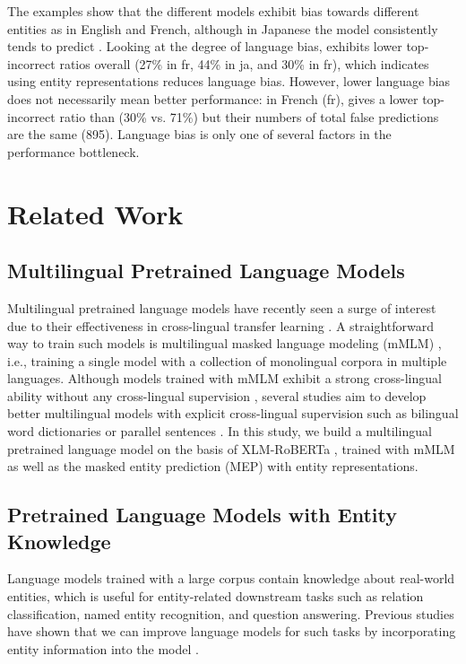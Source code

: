 \documentclass[11pt]{article}
\begin{document}
The examples show that the different models exhibit bias towards different entities as in English and French, although in Japanese the model consistently tends to predict .
Looking at the degree of language bias, \mlukeEwithXY{} exhibits lower top- incorrect ratios overall (27\% in fr, 44\% in ja, and 30\% in fr), which indicates using entity representations reduces language bias.
However, lower language bias does not necessarily mean better performance: in French (fr), \mlukeEwithXY{} gives
a lower top- incorrect ratio than \mbert{} (30\% vs. 71\%) but their numbers of total false predictions are the same (895).
Language bias is only one of several factors in the performance bottleneck.
  \section{Related Work}

\subsection{Multilingual Pretrained Language Models}
Multilingual pretrained language models have recently seen a surge of interest due to their effectiveness in cross-lingual transfer learning \citep{NEURIPS2019_c04c19c2,liu-etal-2020-multilingual}.
A straightforward way to train such models is multilingual masked language modeling (mMLM) \citep{devlin2018bert,conneau-etal-2020-unsupervised}, i.e., training a single model with a collection of monolingual corpora in multiple languages.
Although models trained with mMLM exhibit a strong cross-lingual ability without any cross-lingual supervision \citep{K-mBERT-ICLR-2020,conneau-etal-2020-emerging}, several studies aim to develop better multilingual models with explicit cross-lingual supervision such as bilingual word dictionaries \citep{conneau-etal-2020-emerging} or parallel sentences \citep{NEURIPS2019_c04c19c2}.
In this study, we build a multilingual pretrained language model on the basis of XLM-RoBERTa \citep{conneau-etal-2020-unsupervised}, trained with mMLM as well as the masked entity prediction (MEP) \citep{yamada-etal-2020-luke} with entity representations.

\subsection{Pretrained Language Models with Entity Knowledge}
Language models trained with a large corpus contain knowledge about real-world entities, which is useful for entity-related downstream tasks such as relation classification, named entity recognition, and question answering.
Previous studies have shown that we can improve language models for such tasks by incorporating entity information into the model \citep{Zhang2019,peters-knowbert,wang2019kepler,Xiong2020Pretrained,fevry-etal-2020-entities,yamada-etal-2020-luke}.
\end{document}

